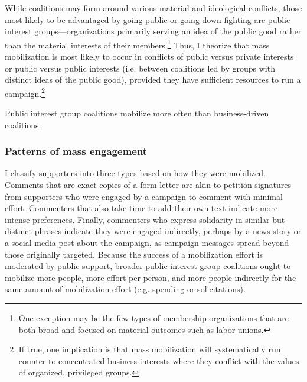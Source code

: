\begin{subhyp}
While coalitions may form around various material and ideological conflicts, those most likely to be advantaged by going public or going down fighting are public interest groups---organizations primarily serving an idea of the public good rather than the material interests of their members.\footnote{
One exception may be the few types of membership organizations that are both broad and focused on material outcomes such as labor unions.} Thus, I theorize that mass mobilization is most likely to occur in conflicts of public versus private interests or public versus public interests (i.e. between coalitions led by groups with distinct ideas of the public good), provided they have sufficient resources to run a campaign.\footnote{
If true, one implication is that mass mobilization will systematically run counter to concentrated business interests where they conflict with the values of organized, privileged groups.
}

\begin{hyp}
Public interest group coalitions mobilize more often than business-driven coalitions.
\end{hyp}










\subsubsection{Patterns of mass engagement} I classify supporters into three types based on how they were mobilized.  Comments that are exact copies of a form letter are akin to petition signatures from supporters who were engaged by a campaign to comment with minimal effort. Commenters that also take time to add their own text indicate more intense preferences. Finally, commenters who express solidarity in similar but distinct phrases indicate they were engaged indirectly, perhaps by a news story or a social media post about the campaign, 
as campaign messages spread beyond those originally targeted. Because the success of a mobilization effort is moderated by public support, broader public interest group coalitions ought to mobilize more people, more effort per person, and more people indirectly for the same amount of mobilization effort (e.g. spending or solicitations).  


\end{subhyp}

